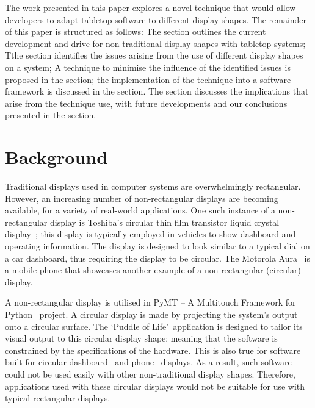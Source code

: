 \documentclass{bmcart}
\begin{document}
The work presented in this paper explores a novel technique that would allow developers to adapt tabletop software to different display shapes.
The remainder of this paper is structured as follows: 
The  section outlines the current development and drive for non-traditional display shapes with tabletop systems;
Tthe  section identifies the issues arising from the use of different display shapes on a system;
A technique to minimise the influence of the identified issues is proposed in the  section;
the implementation of the technique into a software framework is discussed in the  section.
The  section discusses the implications that arise
from the technique use, with future developments and our conclusions presented in the  section.

\section*{Background}
\label{sec:related}

Traditional displays used in computer systems are overwhelmingly rectangular.
However, an increasing number of non-rectangular displays are becoming available, for a variety of real-world applications.
One such instance of a non-rectangular display is Toshiba's circular
thin film transistor liquid crystal display~\cite{Boyd2007}; this display is typically employed in vehicles to show dashboard and operating information.
The display is designed to look similar to a typical dial on a car dashboard, thus requiring the display to be circular.
The Motorola Aura~\cite{Finney2009} is a mobile phone that showcases another example of a non-rectangular (circular) display.

A non-rectangular display is utilised in PyMT -- A Multitouch Framework for Python~\cite{Hansen2009} project.
A circular display is made by projecting the system's output onto a circular surface.
The \lq Puddle of Life\rq\ application is designed to tailor its visual output to this circular display shape; meaning that the software is constrained by the specifications of the hardware.
This is also true for software built for circular dashboard~\cite{Boyd2007} and phone~\cite{Finney2009} displays.
As a result, such software could not be used easily with other non-traditional display shapes.
Therefore, applications used with these circular displays would not be suitable for use with typical rectangular displays.
\end{document}
